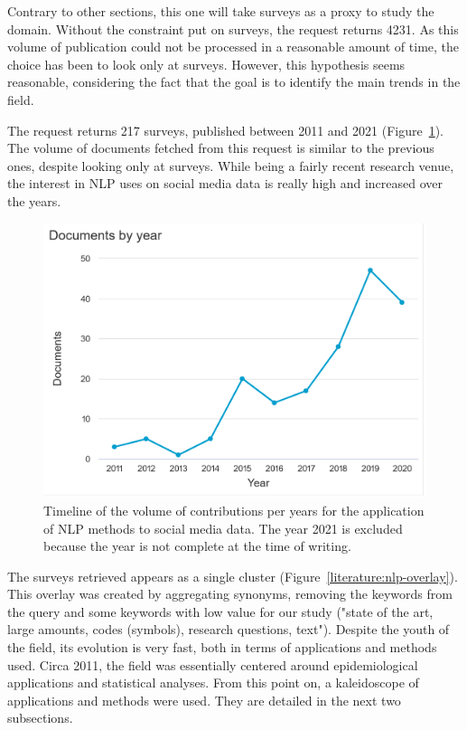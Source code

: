 Contrary to other sections, this one will take surveys as a proxy to study the domain.
Without the constraint put on surveys, the request returns 4231.
As this volume of publication could not be processed in a reasonable amount of time, the choice has been to look only at surveys.
However, this hypothesis seems reasonable, considering the fact that the goal is to identify the main trends in the field.

The request returns 217 surveys, published between 2011 and 2021 (Figure~\ref{literature:nlp-hist}).
The volume of documents fetched from this request is similar to the previous ones, despite looking only at surveys.
While being a fairly recent research venue, the interest in NLP uses on social media data is really high and increased over the years.

\begin{figure}[htb]
    \centering
    \includegraphics[width=\textwidth]{figures/chap-2/nlp-hist.pdf}
    \caption{Timeline of the volume of contributions per years for the application of NLP methods to social media data. The year 2021 is excluded because the year is not complete at the time of writing.}
    \label{literature:nlp-hist}
\end{figure}

The surveys retrieved appears as a single cluster (Figure~\ref{literature:nlp-overlay}).
This overlay was created by aggregating synonyms, removing the keywords from the query and some keywords with low value for our study ("state of the art, large amounts, codes (symbols), research questions, text").
Despite the youth of the field, its evolution is very fast, both in terms of applications and methods used.
Circa 2011, the field was essentially centered around epidemiological applications and statistical analyses.
From this point on, a kaleidoscope of applications and methods were used.
They are detailed in the next two subsections.

